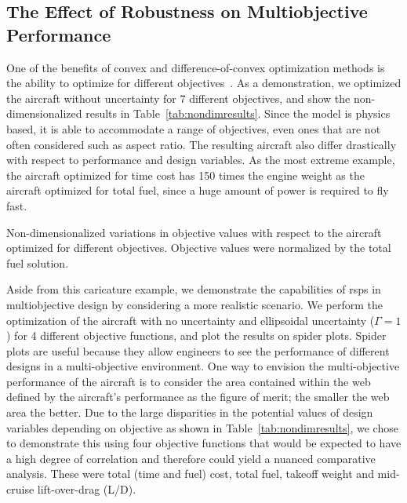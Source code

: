 \subsection{The Effect of Robustness on Multiobjective Performance}

One of the benefits of convex and difference-of-convex optimization methods is the ability to optimize for
different objectives~\cite{York2018}. As a demonstration, we optimized the aircraft without uncertainty
for 7 different objectives, and show
the non-dimensionalized results in Table~\ref{tab:nondimresults}.
Since the model is physics based, it is able to accommodate a range of objectives,
even ones that are not often considered such as aspect ratio. The resulting aircraft
also differ drastically with respect to performance and design variables.
As the most extreme example,
the aircraft optimized for time cost has 150 times the engine weight as the aircraft
optimized for total fuel, since a huge amount of power is required to fly fast.

\begin{table}
\caption{Non-dimensionalized variations in objective values with respect to the aircraft optimized
for different objectives. Objective values were normalized by the total fuel solution.}
    \label{tab:nondimresults}
\end{table}

Aside from this caricature example, we demonstrate the capabilities of \gls{rsp}s in
multiobjective design by considering a more realistic scenario.
We perform the optimization of the aircraft with no uncertainty and ellipsoidal uncertainty ($\Gamma = 1$)
for 4 different objective functions, and plot the results on spider plots.
Spider plots are useful because they allow engineers to see the performance of
different designs in a multi-objective
environment. One way to envision the multi-objective
performance of the aircraft is to consider the area contained within the web defined by the aircraft's
performance as the figure of merit; the smaller the web area the better.
Due to the large disparities in the potential values of design variables depending
on objective as shown in Table~\ref{tab:nondimresults}, we chose to demonstrate this using four objective functions
that would be expected to have a high degree of correlation and therefore could yield a
nuanced comparative analysis. These were
total (time and fuel) cost, total fuel, takeoff weight and mid-cruise lift-over-drag (L/D).

